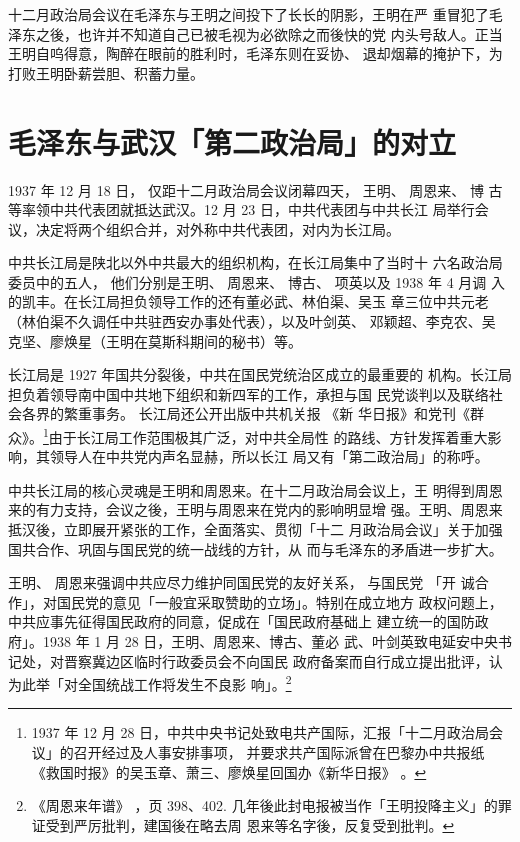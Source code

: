 十二月政治局会议在毛泽东与王明之间投下了长长的阴影，王明在严
重冒犯了毛泽东之後，也许并不知道自己已被毛视为必欲除之而後快的党
内头号敌人。正当王明自呜得意，陶醉在眼前的胜利时，毛泽东则在妥协、
退却烟幕的掩护下，为打败王明卧薪尝胆、积蓄力量。


\section{毛泽东与武汉「第二政治局」的对立}

1937 年 12 月 18 日， 仅距十二月政治局会议闭幕四天， 王明、 周恩来、 博
古等率领中共代表团就抵达武汉。12 月 23 日，中共代表团与中共长江 局举行会
议，决定将两个组织合并，对外称中共代表团，对内为长江局。

中共长江局是陕北以外中共最大的组织机构，在长江局集中了当时十 六名政治局
委员中的五人， 他们分别是王明、 周恩来、 博古、 项英以及 1938 年 4 月调
入的凯丰。在长江局担负领导工作的还有董必武、林伯渠、吴玉 章三位中共元老
（林伯渠不久调任中共驻西安办事处代表），以及叶剑英、 邓颖超、李克农、吴
克坚、廖焕星（王明在莫斯科期间的秘书）等。

长江局是 1927 年国共分裂後，中共在国民党统治区成立的最重要的
机构。长江局担负着领导南中国中共地下组织和新四军的工作，承担与国
民党谈判以及联络社会各界的繁重事务。
长江局还公开出版中共机关报
《新
华日报》和党刊《群众》。\footnote{ 1937 年 12 月 28 日，中共中央书记处致电共产国际，汇报「十二月政治局会议」的召开经过及人事安排事项，
并要求共产国际派曾在巴黎办中共报纸《救国时报》的吴玉章、萧三、廖焕星回国办《新华日报》
。}由于长江局工作范围极其广泛，对中共全局性
的路线、方针发挥着重大影响，其领导人在中共党内声名显赫，所以长江
局又有「第二政治局」的称呼。

中共长江局的核心灵魂是王明和周恩来。在十二月政治局会议上，王
明得到周恩来的有力支持，会议之後，王明与周恩来在党内的影响明显增
强。王明、周恩来抵汉後，立即展开紧张的工作，全面落实、贯彻「十二
月政治局会议」关于加强国共合作、巩固与国民党的统一战线的方针，从
而与毛泽东的矛盾进一步扩大。

王明、
周恩来强调中共应尽力维护同国民党的友好关系，
与国民党
「开
诚合作」，对国民党的意见「一般宜采取赞助的立场」。特别在成立地方
政权问题上，中共应事先征得国民政府的同意，促成在「国民政府基础上
建立统一的国防政府」。1938 年 1 月 28 日，王明、周恩来、博古、董必
武、叶剑英致电延安中央书记处，对晋察冀边区临时行政委员会不向国民
政府备案而自行成立提出批评，认为此举「对全国统战工作将发生不良影
响」。\footnote{《周恩来年谱》
，页 398、402. 几年後此封电报被当作「王明投降主义」的罪证受到严厉批判，建国後在略去周
恩来等名字後，反复受到批判。 } 

